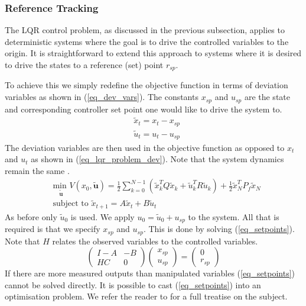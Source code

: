 \subsubsection{Reference Tracking}
\label{sec_lit_ref_track}
The LQR control problem, as discussed in the previous subsection, applies to deterministic systems where the goal is to drive the controlled variables to the origin. It is straightforward to extend this approach to systems where it is desired to drive the states to a reference (set) point $r_{sp}$.

To achieve this we simply redefine the objective function in terms of deviation variables as shown in (\ref{eq_dev_vars}). The constants $x_{sp}$ and $u_{sp}$ are the state and corresponding controller set point one would like to drive the system to.
\begin{equation}
\begin{aligned}
&\tilde{x}_t = x_t-x_{sp} \\
&\tilde{u}_t = u_t-u_{sp}
\end{aligned}
\label{eq_dev_vars}
\end{equation} 
The deviation variables are then used in the objective function as opposed to $x_t$ and $u_t$ as shown in (\ref{eq_lqr_problem_dev}). Note that the system dynamics remain the same \cite{raw}. 
\begin{equation}
\begin{aligned}
&\underset{\tilde{\mathbf{u}}}{\text{min }} V(x_0, \tilde{\mathbf{u}}) = \frac{1}{2}\sum_{k=0}^{N-1} \left( \tilde{x}_k^TQ\tilde{x}_k + \tilde{u}_k^TR\tilde{u}_k \right) + \frac{1}{2}\tilde{x}_N^TP_f\tilde{x}_N \\
& \text{subject to } \tilde{x}_{t+1}=A\tilde{x}_t+B\tilde{u}_t
\end{aligned}
\label{eq_lqr_problem_dev}
\end{equation}
As before only $\tilde{u}_0$ is used. We apply $u_0 = \tilde{u}_0 + u_{sp}$ to the system. All that is required is that we specify $x_{sp}$ and $u_{sp}$. This is done by solving (\ref{eq_setpoints}). Note that $H$ relates the observed variables to the controlled variables.
\begin{equation}
\begin{pmatrix}
I-A &- B \\ HC & 0
\end{pmatrix} \begin{pmatrix}
x_{sp}\\u_{sp}
\end{pmatrix} = \begin{pmatrix}
0 \\ r_{sp}
\end{pmatrix}
\label{eq_setpoints}
\end{equation}
If there are more measured outputs than manipulated variables (\ref{eq_setpoints}) cannot be solved directly. It is possible to cast (\ref{eq_setpoints}) into an optimisation problem. We refer the reader to \cite{raw} for a full treatise on the subject.
 
